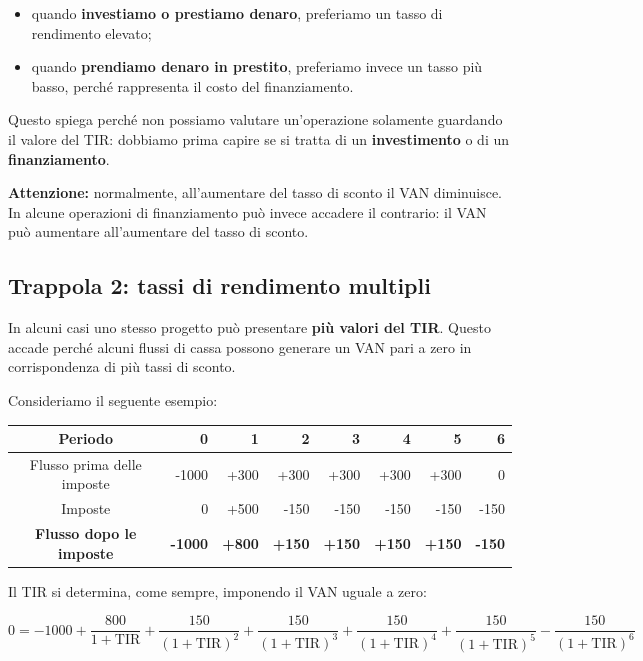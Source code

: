 \begin{itemize}
    \item quando \textbf{investiamo o prestiamo denaro}, preferiamo un tasso di
    rendimento elevato;
    \item quando \textbf{prendiamo denaro in prestito}, preferiamo invece un
    tasso più basso, perché rappresenta il costo del finanziamento.
\end{itemize}

\noindent Questo spiega perché non possiamo valutare un'operazione solamente
guardando il valore del TIR: dobbiamo prima capire se si tratta di un
\textbf{investimento} o di un \textbf{finanziamento}.

\medskip
\noindent\textbf{Attenzione:} normalmente, all'aumentare del tasso di sconto
il VAN diminuisce. In alcune operazioni di finanziamento può invece accadere
il contrario: il VAN può aumentare all'aumentare del tasso di sconto.
\subsection*{Trappola 2: tassi di rendimento multipli}

\noindent In alcuni casi uno stesso progetto può presentare \textbf{più valori del TIR}.
Questo accade perché alcuni flussi di cassa possono generare un VAN pari a zero
in corrispondenza di più tassi di sconto.

\noindent Consideriamo il seguente esempio:

\begin{center}
\begin{tabular}{c|rrrrrrr}
\textbf{Periodo} & 0 & 1 & 2 & 3 & 4 & 5 & 6 \\
\hline
Flusso prima delle imposte
& -1000 & +300 & +300 & +300 & +300 & +300 & 0 \\

Imposte
& 0 & +500 & -150 & -150 & -150 & -150 & -150 \\

\hline
\textbf{Flusso dopo le imposte}
& \textbf{-1000} & \textbf{+800} & \textbf{+150}
& \textbf{+150} & \textbf{+150} & \textbf{+150} & \textbf{-150}
\end{tabular}
\end{center}

\noindent Il TIR si determina, come sempre, imponendo il VAN uguale a zero:

\[
0 =
-1000
+ \frac{800}{1+\mathrm{TIR}}
+ \frac{150}{(1+\mathrm{TIR})^2}
+ \frac{150}{(1+\mathrm{TIR})^3}
+ \frac{150}{(1+\mathrm{TIR})^4}
+ \frac{150}{(1+\mathrm{TIR})^5}
- \frac{150}{(1+\mathrm{TIR})^6}
\]

